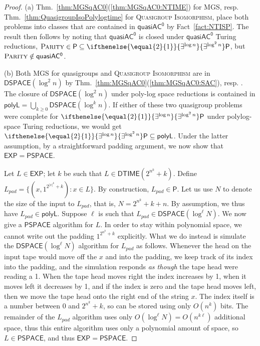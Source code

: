 \documentclass{article}
\newcommand{\algprobm}[1]{\textsc{#1}\xspace}
\newcommand{\betacc}[1]{\ifthenelse{\equal{#1}{1}}{\exists^{\log n}}{\exists^{\log^{#1}n}}} %
\newcommand{\Thm}[1]{Thm.~\ref{#1}\xspace}
\newcommand*{\ComplexityClass}[1]{\ensuremath{\mathsf{#1}}\xspace}
\renewcommand{\P}{\ComplexityClass{P}}
\newcommand*{\EXP}{\ComplexityClass{EXP}}
\newcommand*{\PSPACE}{\ComplexityClass{PSPACE}}
\newcommand{\qACz}{\ComplexityClass{quasiAC^0}}
\newcommand{\DTIME}{\ComplexityClass{DTIME}}
\begin{document}
\begin{proof}
(a) \Thm{thm:MGSqAC0}(\ref{thm:MGSqAC0:NTIME}) for \algprobm{MGS}, resp. \Thm{thm:QuasigroupIsoPolylogtime} for \algprobm{Quasigroup Isomorphism}, place both problems into classes that are contained in $\qACz$ by Fact~\ref{fact:NTISP}. The result then follows by noting that $\qACz$ is closed under $\qACz$ Turing reductions, $\algprobm{Parity} \in \P \subseteq \betacc{2}\P$, but $\algprobm{Parity} \notin \qACz$.

(b) Both \algprobm{MGS} for quasigroups and \algprobm{Quasigroup Isomorphism} are in $\mathsf{DSPACE}(\log^2 n)$ by \Thm{thm:MGSqAC0}(\ref{thm:MGSqAC0:SAC}), resp. \cite{ChattopadhyayToranWagner}. The closure of $\mathsf{DSPACE}(\log^2 n)$ under poly-log space reductions is contained in $\mathsf{polyL} = \bigcup_{k \geq 0} \mathsf{DSPACE}(\log^k n)$. If either of these two quasigroup problems were complete for $\betacc{2} \P$ under polylog-space Turing reductions, we would get $\betacc{2} \P \subseteq \mathsf{polyL}$. Under the latter assumption, by a straightforward padding argument, we now show that $\EXP = \PSPACE$.

Let $L \in \EXP$; let $k$ be such that $L \in \DTIME(2^{n^k}+k)$. Define $L_{pad} = \{(x,1^{2^{|x|^k}+k}) : x \in L\}$. By construction, $L_{pad} \in \P$. Let us use $N$ to denote the size of the input to $L_{pad}$, that is, $N = 2^{n^k}+k+n$. By assumption, we thus have $L_{pad} \in \mathsf{polyL}$. Suppose $\ell$ is such that $L_{pad} \in \mathsf{DSPACE}(\log^\ell N)$. We now give a $\PSPACE$ algorithm for $L$. In order to stay within polynomial space, we cannot write out the padding $1^{2^{n^k}+k}$ explicitly. What we do instead is simulate the $\mathsf{DSPACE}(\log^\ell N)$ algorithm for $L_{pad}$ as follows. Whenever the head on the input tape would move off the $x$ and into the padding, we keep track of its index into the padding, and the simulation responds \emph{as though} the tape head were reading a 1. When the tape head moves right the index increases by 1, when it moves left it decreases by 1, and if the index is zero and the tape head moves left, then we move the tape head onto the right end of the string $x$. The index itself is a number between $0$ and $2^{n^k}+k$, so can be stored using only $O(n^k)$ bits. The remainder of the $L_{pad}$ algorithm uses only $O(\log^\ell N) = O(n^{k\ell})$ additional space, thus this entire algorithm uses only a polynomial amount of space, so $L \in \PSPACE$, and thus $\EXP=\PSPACE$.
\end{proof}
\end{document}
